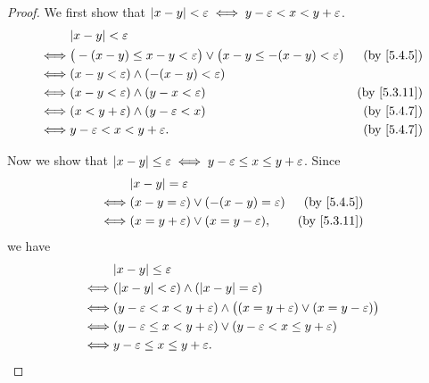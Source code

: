 \begin{proof}
  We first show that \(\left\lvert x - y\right\rvert < \varepsilon \iff y - \varepsilon < x < y + \varepsilon\).
  \begin{align*}
         & \abs{x - y} < \varepsilon                                                                                                \\
    \iff & \big(-(x - y) \leq x - y < \varepsilon\big) \lor \big(x - y \leq -(x - y) < \varepsilon\big) & \text{(by \cref{5.4.5})}  \\
    \iff & (x - y < \varepsilon) \land (-(x - y) < \varepsilon)                                                                     \\
    \iff & (x - y < \varepsilon) \land (y - x < \varepsilon)                                            & \text{(by \cref{5.3.11})} \\
    \iff & (x < y + \varepsilon) \land (y - \varepsilon < x)                                            & \text{(by \cref{5.4.7})}  \\
    \iff & y - \varepsilon < x < y + \varepsilon.                                                       & \text{(by \cref{5.4.7})}
  \end{align*}

  Now we show that \(\left\lvert x - y\right\rvert \leq \varepsilon \iff y - \varepsilon \leq x \leq y + \varepsilon\).
  Since
  \begin{align*}
         & \abs{x - y} = \varepsilon                                                       \\
    \iff & (x - y = \varepsilon) \lor (-(x - y) = \varepsilon) & \text{(by \cref{5.4.5})}  \\
    \iff & (x = y + \varepsilon) \lor (x = y - \varepsilon),   & \text{(by \cref{5.3.11})}
  \end{align*}
  we have
  \begin{align*}
         & \abs{x - y} \leq \varepsilon                                                                             \\
    \iff & (\abs{x - y} < \varepsilon) \land (\abs{x - y} = \varepsilon)                                            \\
    \iff & (y - \varepsilon < x < y + \varepsilon) \land \big((x = y + \varepsilon) \lor (x = y - \varepsilon)\big) \\
    \iff & (y - \varepsilon \leq x < y + \varepsilon) \lor (y - \varepsilon < x \leq y + \varepsilon)               \\
    \iff & y - \varepsilon \leq x \leq y + \varepsilon.
  \end{align*}
\end{proof}

